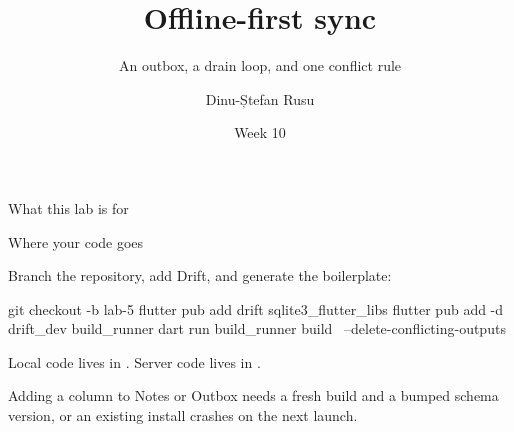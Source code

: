 \documentclass[10pt,aspectratio=169,t]{beamer}
\title{Offline-first sync}
\subtitle{An outbox, a drain loop, and one conflict rule}
\author{Dinu-Ștefan Rusu}
\institute{FILS, Universitatea Politehnica București}
\date{Week 10}
\begin{document}
\titleframe

\begin{frame}[eyebrow=Today]{What this lab is for}
  \vskip 2mm
  \begin{grid}[2]
  \end{grid}
  \vskip 6mm
\end{frame}

\begin{frame}[fragile,eyebrow=Setup]{Where your code goes}
  \begin{steps}
    \item Branch the repository, add Drift, and generate the boilerplate:
\begin{shell}
git checkout -b lab-5
flutter pub add drift sqlite3_flutter_libs
flutter pub add -d drift_dev build_runner
dart run build_runner build \
    --delete-conflicting-outputs
\end{shell}
    \item Local code lives in . Server code lives in .
  \end{steps}
  \begin{hint}
    Adding a column to Notes or Outbox needs a fresh build and a bumped schema version, or an existing install crashes on the next launch.
  \end{hint}
\end{frame}
\end{document}
